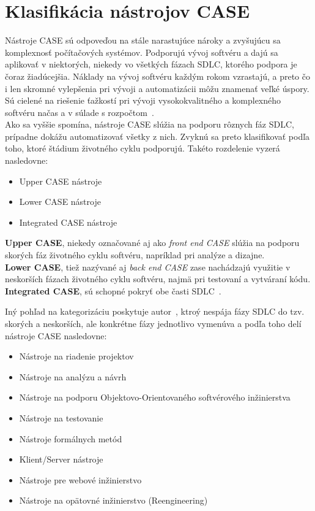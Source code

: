 \documentclass[10pt,twoside,slovak,a4paper]{article}
\begin{document}
\section{Klasifikácia nástrojov CASE}\label{klasifikácia}

Nástroje CASE sú odpoveďou na stále narastujúce nároky a zvyšujúcu sa komplexnosť počítačových systémov. Podporujú vývoj softvéru a dajú sa aplikovať v niektorých, niekedy vo všetkých fázach SDLC, ktorého podpora je čoraz žiadúcejšia. Náklady na vývoj softvéru každým rokom vzrastajú, a preto čo i len skromné vylepšenia pri vývoji a automatizácii môžu znamenať veľké úspory.  Sú cielené na riešenie ťažkostí pri vývoji vysokokvalitného a komplexného softvéru načas a v súlade s rozpočtom~\cite{2001}. \\



Ako sa vyššie spomína, nástroje CASE slúžia na podporu rôznych fáz SDLC, prípadne dokážu automatizovať všetky z nich. Zvyknú sa preto klasifikovať podľa toho, ktoré štádium životného cyklu podporujú. Takéto rozdelenie vyzerá nasledovne:

\begin{itemize}
\item Upper CASE nástroje
\item Lower CASE nástroje
\item Integrated CASE nástroje
\end{itemize}
\textbf{Upper CASE}, niekedy označované aj ako \emph{front end CASE} slúžia na podporu skorých fáz životného cyklu softvéru, napríklad pri analýze a dizajne.\\
\textbf{Lower CASE}, tiež nazývané aj \emph{back end CASE} zase nachádzajú využitie v neskorších fázach životného cyklu softvéru, najmä pri testovaní a vytváraní kódu.\\
\textbf{Integrated CASE}, sú schopné pokryť obe časti SDLC~\cite{1998}.


Iný pohľad na kategorizáciu poskytuje autor~\cite{2017}, ktroý nespája fázy SDLC do tzv. skorých a neskorších, ale konkrétne fázy jednotlivo vymenúva a podľa toho delí nástroje CASE nasledovne:
\begin{itemize}
\item Nástroje na riadenie projektov
\item Nástroje na analýzu a návrh
\item Nástroje na podporu Objektovo-Orientovaného softvérového inžinierstva
\item Nástroje na testovanie
\item Nástroje formálnych metód
\item Klient/Server nástroje
\item Nástroje pre webové inžinierstvo
\item Nástroje na opätovné inžinierstvo (Reengineering)
\end{itemize}
\end{document}
